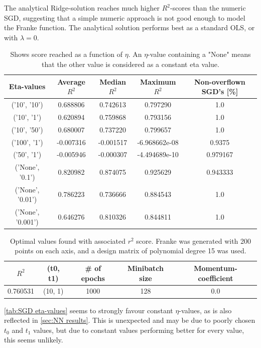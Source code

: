 \documentclass[a4paper, UKenglish]{article}
\newcommand{\0}{\mathbf{0}}
\newcommand{\1}{\mathbf{1}}
\begin{document}
The analytical Ridge-solution reaches much higher $R^2$-scores than the numeric SGD, suggesting that a simple numeric approach is not good enough to model the Franke function. The analytical solution performs best as a standard OLS, or with $\lambda = 0$.

\begin{table}[H] 
\centering
\caption{Shows score reached as a function of $\eta$. An $\eta$-value containing a "None" means that the other value is considered as a constant eta value.}
\label{tab:SGD eta-values}
\begin{tabular}{|c|c|c|c|c|}
	\hline
Eta-values & Average $R^2$ & Median $R^2$ & Maximum $R^2$ & Non-overflown SGD's [\%]\\
\hline
('10', '10')       & 0.688806 & 0.742613 & 0.797290 & 1.0 \\
('10', '1')        & 0.620894 & 0.759868 & 0.793156 & 1.0 \\
('10', '50')       & 0.680007 & 0.737220 & 0.799657 & 1.0 \\
('100', '1')       &-0.007316 &-0.001517 &-6.968662e-08 & 0.9375 \\
('50', '1')        &-0.005946 &-0.000307 &-4.494689e-10 & 0.979167 \\
('None', '0.1')    & 0.820982 & 0.874075 & 0.925629 & 0.943333 \\
('None', '0.01')   & 0.786223 & 0.736666 & 0.884543 & 1.0 \\
('None', '0.001')  & 0.646276 & 0.810326 & 0.844811 & 1.0 \\
	\hline
\end{tabular}
\end{table}

\begin{table}[H] 
\centering
\caption{Optimal values found with associated $r^2$ score. Franke was generated with 200 points on each axis, and a design matrix of polynomial degree 15 was used.}
\label{tab:SGD optimal values}
\begin{tabular}{|c|c|c|c|c|}
	\hline
  $R^2$ & (t0, t1) & \# of epochs & Minibatch size & Momentum-coefficient \\
  \hline
  0.760531 & (10, 1) & 1000 & 128 & 0.0 \\
	\hline
\end{tabular}
\end{table}

\autoref{tab:SGD eta-values} seems to strongly favour constant $\eta$-values, as is also reflected in \autoref{sec:NN results}. This is unexpected and may be due to poorly chosen $t_0$ and $t_1$ values, but due to constant values performing better for every value, this seems unlikely.
\end{document}
